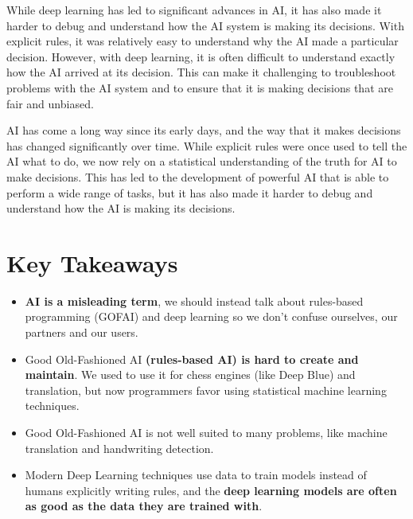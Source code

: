 While deep learning has led to significant advances in AI, it has also made it harder to debug and understand how the AI system is making its decisions. With explicit rules, it was relatively easy to understand why the AI made a particular decision. However, with deep learning, it is often difficult to understand exactly how the AI arrived at its decision. This can make it challenging to troubleshoot problems with the AI system and to ensure that it is making decisions that are fair and unbiased.

AI has come a long way since its early days, and the way that it makes decisions has changed significantly over time. While explicit rules were once used to tell the AI what to do, we now rely on a statistical understanding of the truth for AI to make decisions. This has led to the development of powerful AI that is able to perform a wide range of tasks, but it has also made it harder to debug and understand how the AI is making its decisions.

\section{Key Takeaways}

\begin{itemize}
	\item \textbf{AI is a misleading term}, we should instead talk about rules-based programming (GOFAI) and deep learning so we don't confuse ourselves, our partners and our users. 
	\item Good Old-Fashioned AI \textbf{(rules-based AI) is hard to create and maintain}. We used to use it for chess engines (like Deep Blue) and translation, but now programmers favor using statistical machine learning techniques.
	\item Good Old-Fashioned AI is not well suited to many problems, like machine translation and handwriting detection.
	\item Modern Deep Learning techniques use data to train models instead of humans explicitly writing rules, and the \textbf{deep learning models are often as good as the data they are trained with}.
\end{itemize}

